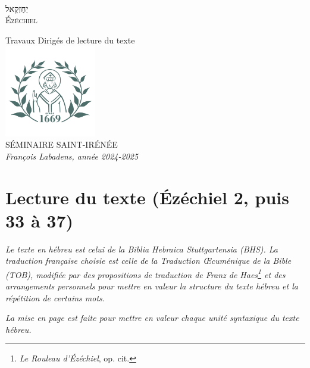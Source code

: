 \documentclass[12pt,a4paper,titlepage]{article}
\author{}
\date{}
\begin{document}
\thispagestyle{empty} %

~
\vspace{10em}
\begin{center}
\fontsize{60}{70}\selectfont \texthebrew{יְחֶזְקֵאל}\\
\fontsize{50}{40}\selectfont \textsc{Ézéchiel} \par
\normalsize Travaux Dirigés de lecture du texte \\
\vfill
\includegraphics[width=4cm]{../assets/seminaire_lyon.png}\\
\vspace{-1em}
SÉMINAIRE SAINT-IRÉNÉE\\
\textit{François Labadens, année 2024-2025}
\end{center}

\newpage
\setcounter{page}{2} %

\newpage

\vspace{2em}

\newpage

\newpage

\newpage

\vspace{2em}
\section*{Lecture du texte (Ézéchiel 2, puis 33 à 37)}
\textit{Le texte en hébreu est celui de la Biblia Hebraica Stuttgartensia (BHS).
La traduction française choisie est celle de la Traduction Œcuménique de la Bible (TOB), modifiée par des propositions de traduction de Franz de Haes\footnote{\textit{Le Rouleau d'Ézéchiel}, op. cit.} et des arrangements personnels pour mettre en valeur la structure du texte hébreu et la répétition de certains mots.}\par
\textit{La mise en page est faite pour mettre en valeur chaque unité syntaxique du texte hébreu.}
\newpage 

\end{document}

